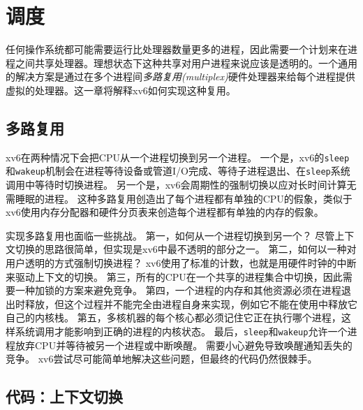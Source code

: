 \chapter{调度}\label{ch07}

任何操作系统都可能需要运行比处理器数量更多的进程，因此需要一个计划来在进程之间共享处理器。理想状态下这种共享对用户进程来说应该是透明的。一个通用的解决方案是通过在多个进程间\emph{多路复用(multiplex)}硬件处理器来给每个进程提供虚拟的处理器。这一章将解释xv6如何实现这种复用。

\section{多路复用}
xv6在两种情况下会把CPU从一个进程切换到另一个进程。
一个是，xv6的\texttt{sleep}和\texttt{wakeup}机制会在进程等待设备或管道I/O完成、等待子进程退出、在\texttt{sleep}系统调用中等待时切换进程。
另一个是，xv6会周期性的强制切换以应对长时间计算无需睡眠的进程。
这种多路复用创造出了每个进程都有单独的CPU的假象，类似于xv6使用内存分配器和硬件分页表来创造每个进程都有单独的内存的假象。

实现多路复用也面临一些挑战。
第一，如何从一个进程切换到另一个？
尽管上下文切换的思路很简单，但实现是xv6中最不透明的部分之一。
第二，如何以一种对用户透明的方式强制切换进程？
xv6使用了标准的计数，也就是用硬件时钟的中断来驱动上下文的切换。
第三，所有的CPU在一个共享的进程集合中切换，因此需要一种加锁的方案来避免竞争。
第四，一个进程的内存和其他资源必须在进程退出时释放，但这个过程并不能完全由进程自身来实现，例如它不能在使用中释放它自己的内核栈。
第五，多核机器的每个核心都必须记住它正在执行哪个进程，这样系统调用才能影响到正确的进程的内核状态。
最后，\texttt{sleep}和\texttt{wakeup}允许一个进程放弃CPU并等待被另一个进程或中断唤醒。
需要小心避免导致唤醒通知丢失的竞争。
xv6尝试尽可能简单地解决这些问题，但最终的代码仍然很棘手。

\section{代码：上下文切换}
